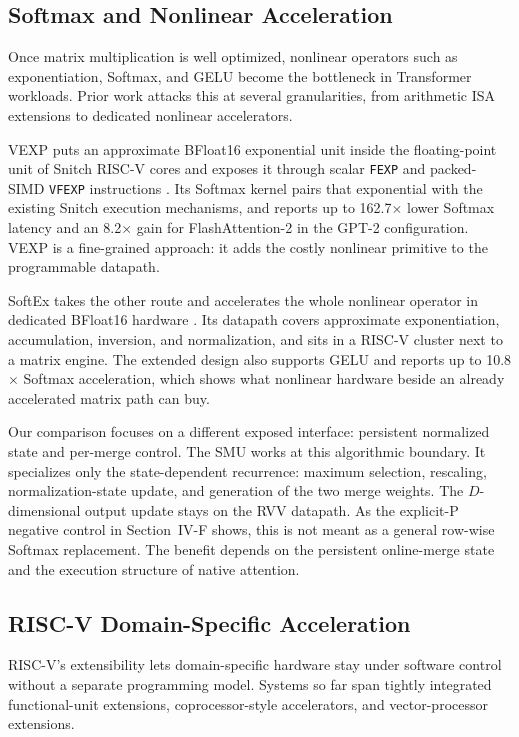 \documentclass[journal]{IEEEtran}
\begin{document}
\subsection{Softmax and Nonlinear Acceleration}

Once matrix multiplication is well optimized, nonlinear operators such as
exponentiation, Softmax, and GELU become the bottleneck in Transformer
workloads. Prior work attacks this at several granularities, from arithmetic ISA
extensions to dedicated nonlinear accelerators.

VEXP puts an approximate BFloat16 exponential unit inside the floating-point
unit of Snitch RISC-V cores and exposes it through scalar \texttt{FEXP} and
packed-SIMD \texttt{VFEXP} instructions \cite{wang2025vexp}. Its Softmax kernel
pairs that exponential with the existing Snitch execution mechanisms, and
reports up to 162.7$\times$ lower Softmax latency and an 8.2$\times$ gain for
FlashAttention-2 in the GPT-2 configuration. VEXP is a fine-grained approach:
it adds the costly nonlinear primitive to the programmable datapath.

SoftEx takes the other route and accelerates the whole nonlinear operator in
dedicated BFloat16 hardware \cite{belano2025softex}. Its datapath covers
approximate exponentiation, accumulation, inversion, and normalization, and
sits in a RISC-V cluster next to a matrix engine. The extended design also
supports GELU and reports up to 10.8$\times$ Softmax acceleration, which shows
what nonlinear hardware beside an already accelerated matrix path can buy.

Our comparison focuses on a different exposed interface: persistent normalized
state and per-merge control. The SMU works at this
algorithmic boundary. It specializes only the state-dependent recurrence:
maximum selection, rescaling, normalization-state update, and generation of the
two merge weights. The $D$-dimensional output update stays on the RVV datapath.
As the explicit-P negative control in Section~IV-F shows, this is not meant as
a general row-wise Softmax replacement. The benefit depends on the persistent
online-merge state and the execution structure of native attention.

\subsection{RISC-V Domain-Specific Acceleration}

RISC-V's extensibility lets domain-specific hardware stay under software
control without a separate programming model. Systems so far span tightly
integrated functional-unit extensions, coprocessor-style accelerators, and
vector-processor extensions.
\end{document}
